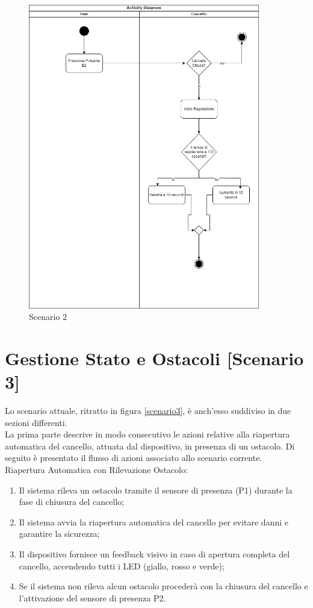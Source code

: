 \begin{figure}[H]
    \centering
    \includegraphics[width=0.9\textwidth]{figures/scenario2.drawio.png}
    \caption{Scenario 2}
    \label{scenario2}
\end{figure}


\section{Gestione Stato e Ostacoli [Scenario 3]}
\noindent Lo scenario attuale, ritratto in figura \ref{scenario3}, è anch'esso suddiviso in due sezioni differenti. \\

La prima parte descrive in modo consecutivo le azioni relative alla riapertura automatica del cancello, attuata dal dispositivo, in presenza di un ostacolo.
Di seguito è presentato il flusso di azioni associato allo scenario corrente. \\

\noindent Riapertura Automatica con Rilevazione Ostacolo:

\begin{enumerate}
    \item Il sistema rileva un ostacolo tramite il sensore di presenza (P1) durante la fase di chiusura del cancello;
    \item Il sistema avvia la riapertura automatica del cancello per evitare danni e garantire la sicurezza;
    \item Il dispositivo fornisce un feedback visivo in caso di apertura completa del cancello, accendendo tutti i LED (giallo, rosso e verde);
    \item Se il sistema non rileva alcun ostacolo procederà con la chiusura del cancello e l'attivazione del sensore di presenza P2.
\end{enumerate}

